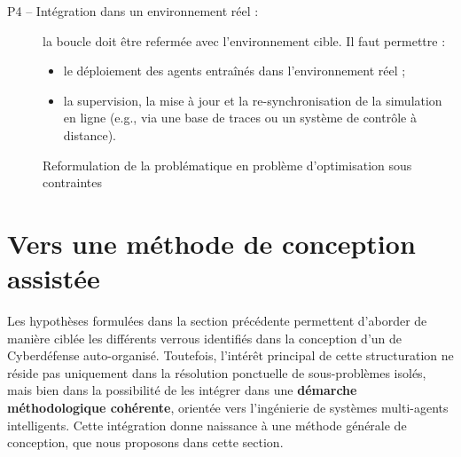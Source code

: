 \begin{description}
    \item[P4 -- Intégration dans un environnement réel :] la boucle doit être refermée avec l'environnement cible. Il faut permettre :
        \begin{itemize}
            \item le déploiement des agents entraînés dans l'environnement réel ;
            \item la supervision, la mise à jour et la re-synchronisation de la simulation en ligne (e.g., via une base de traces ou un système de contrôle à distance).
        \end{itemize}
\end{description}

\begin{figure}[H]
    \centering
    \resizebox{\textwidth}{!}{%
        
    }
    \caption{Reformulation de la problématique en problème d'optimisation sous contraintes}
    \label{fig:constrained_optimization_overview}
\end{figure}

\section{Vers une méthode de conception assistée}\label{sec:method-response}


Les hypothèses formulées dans la section précédente permettent d'aborder de manière ciblée les différents verrous identifiés dans la conception d'un  de Cyberdéfense auto-organisé. Toutefois, l'intérêt principal de cette structuration ne réside pas uniquement dans la résolution ponctuelle de sous-problèmes isolés, mais bien dans la possibilité de les intégrer dans une \textbf{démarche méthodologique cohérente}, orientée vers l'ingénierie de systèmes multi-agents intelligents. Cette intégration donne naissance à une méthode générale de conception, que nous proposons dans cette section.

